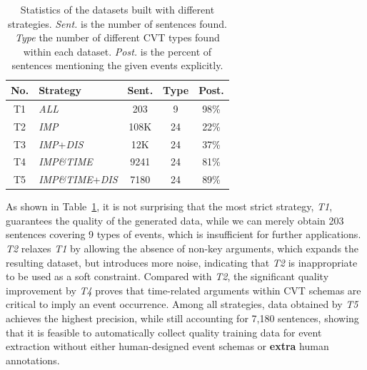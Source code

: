 \begin{table}[h]
\small
\centering
\begin{tabular}{|c|l|c|c|c|} \hline
	No. & Strategy & Sent. & Type & Post. \\ \hline
	T1 & \emph{ALL} & 203 & 9 & 98\% \\ \hline
	T2 & \emph{IMP} & 108K & 24 & 22\% \\ \hline
	T3 & \emph{IMP}+\emph{DIS} & 12K & 24 & 37\% \\ \hline
	T4 & \emph{IMP\&TIME} & 9241 & 24 & 81\% \\ \hline
	T5 & \emph{IMP\&TIME}+\emph{DIS} & 7180 & 24 & 89\% \\ \hline
\end{tabular}
\caption{Statistics of the datasets built with different strategies. 
\textit{Sent.} is the number of sentences found. \textit{Type} the number of different CVT types found within each dataset.  \textit{Post.} is the percent of sentences mentioning the given events explicitly. \label{tab:3}}
\vspace{-0.5em}
\end{table}

As shown in Table~\ref{tab:3}, it is not surprising that the most strict strategy, \emph{T1}, guarantees the quality of the generated data, while we can merely obtain 203 sentences covering 9 types of events, which is insufficient for further applications. \emph{T2} relaxes \emph{T1} by allowing the absence of non-key arguments, which expands the resulting dataset, but introduces more noise, indicating that \emph{T2} is inappropriate to be used as a soft constraint. Compared with \emph{T2}, the significant quality improvement by \emph{T4} proves that time-related arguments within CVT schemas are critical to imply an event occurrence. Among all strategies, data obtained by \emph{T5} achieves the highest precision, while still accounting for 7,180 sentences, showing that it is feasible to automatically collect quality training data for event extraction without either human-designed event schemas or \textbf{extra} human annotations.     

